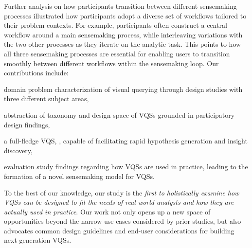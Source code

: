 \par Further analysis on how participants transition between different sensemaking processes illustrated how participants adopt a diverse set of workflows tailored to their problem contexts. For example, participants often construct a central workflow around a main sensemaking process, while interleaving variations with the two other processes as they iterate on the analytic task. This points to how all three sensemaking processes are essential for enabling users to transition smoothly between different workflows within the sensemaking loop. Our contributions include: 
\begin{denselist}
\item domain problem characterization of visual querying through design studies with three different subject areas,
\item abstraction of taxonomy and design space of VQSs grounded in participatory design findings,
\item a full-fledge VQS, \zvpp, capable of facilitating rapid hypothesis generation and insight discovery,
\item evaluation study findings regarding how VQSs are used in practice, leading to the formation of a novel sensemaking model for VQSs. %
\end{denselist}
To the best of our knowledge, our study is the \emph{first to holistically examine how VQSs can be designed to fit the needs of real-world analysts and how they are actually used in practice}. Our work not only opens up a new space of opportunities beyond the narrow use cases considered by prior studies, but also advocates common design guidelines and end-user considerations for building next generation VQSs. %

